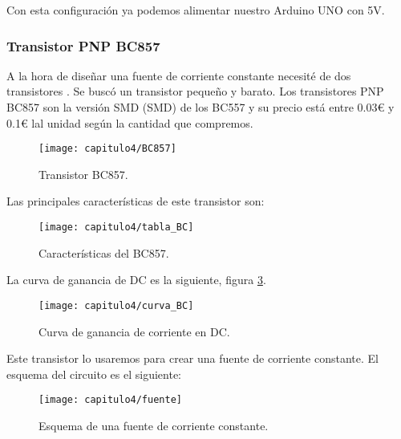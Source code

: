 Con esta configuración ya podemos alimentar nuestro Arduino UNO con 5V.

\subsubsection{Transistor PNP BC857}
\label{sec:BC}
A la hora de diseñar una fuente de corriente constante necesité de dos transistores . Se buscó un transistor pequeño y barato. Los transistores PNP BC857 son la versión \acrshort{SMD} (\acrlong{SMD}) de los BC557 y su precio está entre 0.03\textup{\euro} y 0.1\textup{\euro} lal unidad según la cantidad que compremos.

\hfill
\begin{figure}[H]%
\noindent \begin{centering}
\texttt{[image: capitulo4/BC857]}
\par\end{centering}
\caption{\label{fig:BC857} Transistor  BC857.}
\end{figure}
\hfill

Las principales características de este transistor \cite{BC857} son:

\hfill
\begin{figure}[H]%
\noindent \begin{centering}
\texttt{[image: capitulo4/tabla\_BC]}
\par\end{centering}
\caption{\label{tabla_BC} Características del BC857\cite{BC857}.}
\end{figure}
\hfill


La curva de ganancia de DC es la siguiente, figura \ref{fig:curva_BC}.

\hfill
\begin{figure}[H]%
\noindent \begin{centering}
\texttt{[image: capitulo4/curva\_BC]}
\par\end{centering}
\caption{\label{fig:curva_BC} Curva de ganancia de corriente en DC.}
\end{figure}
\hfill


Este transistor lo usaremos para crear una fuente de corriente constante. El esquema del circuito es el siguiente: 

\smallskip
\begin{figure}[H]%
\noindent \begin{centering}
\texttt{[image: capitulo4/fuente]}
\par\end{centering}
\caption{\label{fuente} Esquema de una fuente de corriente constante.}
\end{figure}
\smallskip



